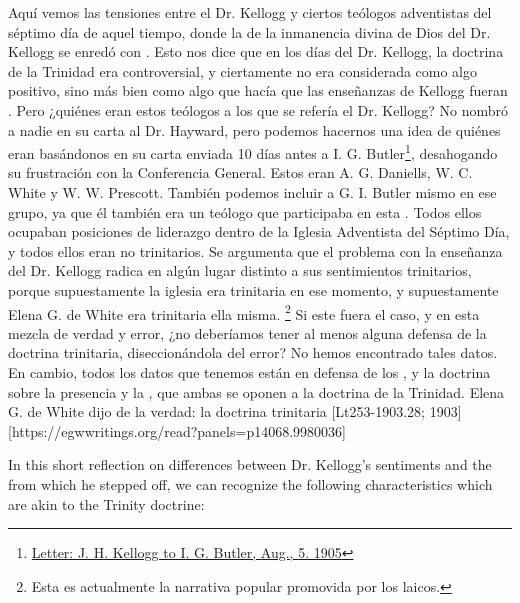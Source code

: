 Aquí vemos las tensiones entre el Dr. Kellogg y ciertos teólogos adventistas del séptimo día de aquel tiempo, donde la  de la inmanencia divina de Dios del Dr. Kellogg se enredó con . Esto nos dice que en los días del Dr. Kellogg, la doctrina de la Trinidad era controversial, y ciertamente no era considerada como algo positivo, sino más bien como algo que hacía que las enseñanzas de Kellogg fueran . Pero ¿quiénes eran estos teólogos a los que se refería el Dr. Kellogg? No nombró a nadie en su carta al Dr. Hayward, pero podemos hacernos una idea de quiénes eran  basándonos en su carta enviada 10 días antes a I. G. Butler\footnote{\href{https://forgotten-pillar.s3.us-east-2.amazonaws.com/1905-08-05-kellogg-butler.pdf}{Letter: J. H. Kellogg to I. G. Butler, Aug., 5. 1905}}, desahogando su frustración con la Conferencia General. Estos eran A. G. Daniells, W. C. White y W. W. Prescott. También podemos incluir a G. I. Butler mismo en ese grupo, ya que él también era un teólogo que participaba en esta . Todos ellos ocupaban posiciones de liderazgo dentro de la Iglesia Adventista del Séptimo Día, y todos ellos eran no trinitarios. Se argumenta que el problema con la enseñanza del Dr. Kellogg radica en algún lugar distinto a sus sentimientos trinitarios, porque supuestamente la iglesia era trinitaria en ese momento, y supuestamente Elena G. de White era trinitaria ella misma. \footnote{Esta es actualmente la narrativa popular promovida por los laicos.} Si este fuera el caso, y en esta mezcla de verdad y error, ¿no deberíamos tener al menos alguna defensa de la doctrina trinitaria, diseccionándola del error? No hemos encontrado tales datos. En cambio, todos los datos que tenemos están en defensa de los , y la doctrina sobre la presencia y la , que ambas se oponen a la doctrina de la Trinidad. Elena G. de White dijo de la verdad: la doctrina trinitaria [Lt253-1903.28; 1903][https://egwwritings.org/read?panels=p14068.9980036]


In this short reflection on differences between Dr. Kellogg's sentiments and the  from which he stepped off, we can recognize the following characteristics which are akin to the Trinity doctrine:



